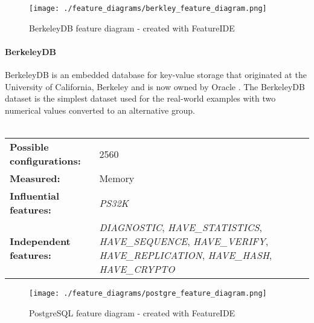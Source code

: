 \documentclass[../../thesis.tex]{subfiles}
\begin{document}
\newpage
\begin{figure}[t]
    \begin{center}
        \texttt{[image: ./feature\_diagrams/berkley\_feature\_diagram.png]}
    \end{center}
    \caption[Feature diagram - BerkeleyDB]{BerkeleyDB feature diagram - created with FeatureIDE}\label{fig:feature_diagram:berkley}
\end{figure}
\paragraph{BerkeleyDB}
BerkeleyDB is an embedded database for key-value storage that originated at the University of California, Berkeley
and is now owned by Oracle \cite{web:berkeleydb}. The BerkeleyDB dataset is the simplest dataset used for the real-world examples with two numerical values
converted to an alternative group.
\\ \\
\begingroup
\renewcommand{\arraystretch}{1.5}
\begin{tabular}{lp{}}
    \textbf{Possible configurations:} & 2560                                                                                                                        \\
    \textbf{Measured:}                & Memory                                                                                                                      \\
    \textbf{Influential features:}    & \textit{PS32K}                                                                                                              \\
    \textbf{Independent features:}    & \textit{DIAGNOSTIC}, \textit{HAVE\_STATISTICS}, \textit{HAVE\_SEQUENCE}, \textit{HAVE\_VERIFY}, \textit{HAVE\_REPLICATION},
    \textit{HAVE\_HASH}, \textit{HAVE\_CRYPTO}                                                                                                                      \\
\end{tabular}
\endgroup


\newpage
\begin{figure}[t]
    \begin{center}
        \texttt{[image: ./feature\_diagrams/postgre\_feature\_diagram.png]}
    \end{center}
    \caption[Feature diagram - PostgreSQL]{PostgreSQL feature diagram - created with FeatureIDE}\label{fig:feature_diagram:postgre}
\end{figure}
\end{document}
